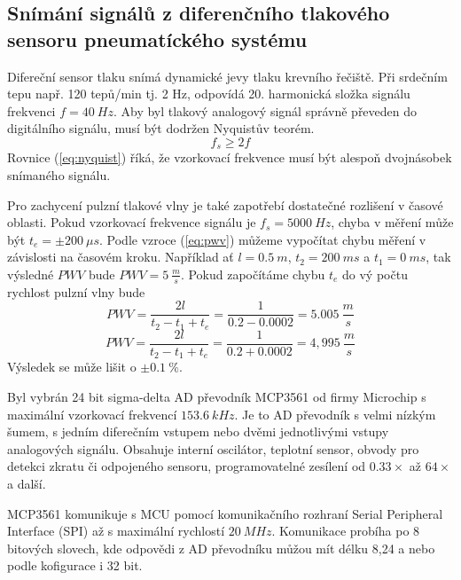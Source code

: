 \subsection{Snímání signálů z diferenčního tlakového sensoru pneumatíckého systému}
Difereční sensor tlaku snímá dynamické jevy tlaku krevního řečiště. Při srdečním tepu např. 120 tepů/min tj. 2 Hz, odpovídá 20. harmonická složka signálu frekvenci  $f = 40 \ Hz$. Aby byl tlakový analogový signál správně převeden do digitálního signálu, musí být dodržen Nyquistův teorém.
\begin{equation} \label{eq:nyquist}
    f_s \geq 2f
\end{equation}
Rovnice (\ref{eq:nyquist}) říká, že vzorkovací frekvence musí být alespoň dvojnásobek snímaného signálu.
\par
Pro zachycení pulzní tlakové vlny je také zapotřebí dostatečné rozlišení v časové oblasti. Pokud vzorkovací frekvence signálu je $f_s = 5000 \ Hz$, chyba v měření může být $t_e = \pm 200 \ \mu s$. Podle vzroce (\ref{eq:pwv}) můžeme vypočítat chybu měření v závislosti na časovém kroku.
Například ať $l = 0.5 \ m$, $t_2 = 200 \ ms$ a $t_1 = 0 \ ms$, tak výsledné $PWV$ bude $PWV = 5 \ \frac{m}{s}$. Pokud započítáme chybu $t_e$ do vý počtu rychlost pulzní vlny bude
\begin{equation*}
    PWV = \frac{2l}{t_2 - t_1 + t_e} = \frac{1}{0.2 - 0.0002} = 5.005 \ \frac{m}{s}
\end{equation*}
\begin{equation*}
    PWV = \frac{2l}{t_2 - t_1 + t_e} = \frac{1}{0.2 + 0.0002} = 4,995 \ \frac{m}{s}
\end{equation*}
Výsledek se může lišit o $\pm 0.1 \ \%$.
\par
Byl vybrán 24 bit sigma-delta AD převodník MCP3561 od firmy Microchip s maximální vzorkovací frekvencí $153.6 \ kHz$. Je to AD převodník s velmi nízkým šumem, s jedním diferečním vstupem nebo dvěmi jednotlivými vstupy analogových signálu.
Obsahuje interní oscilátor, teplotní sensor, obvody pro detekci zkratu či odpojeného sensoru, programovatelné zesílení od $0.33 \times$ až $64 \times$ a další.
\par
MCP3561 komunikuje s MCU pomocí komunikačního rozhraní Serial Peripheral Interface (SPI) až s maximální rychlostí $20 \ MHz$. Komunikace probíha po 8 bitových slovech, kde odpovědi z AD převodníku můžou mít délku 8,24 a nebo podle kofigurace i 32 bit.
